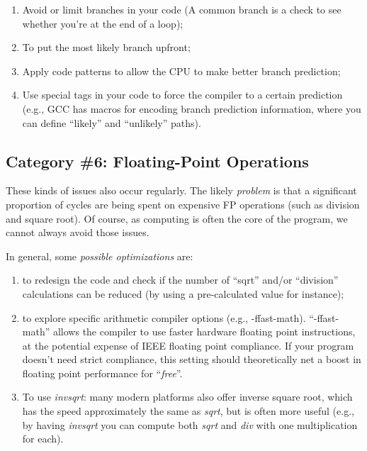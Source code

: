 \begin{enumerate}
  \item  Avoid or limit branches in your code (A common branch is a check to see whether you're at the end of a loop);
  \item  To put the most likely branch upfront;
  \item  Apply code patterns to allow the CPU to make better branch prediction;
  \item  Use special tags in your code to force the compiler to a certain prediction (e.g., GCC has macros for encoding branch prediction information, where you can define ``likely'' and ``unlikely'' paths).
\end{enumerate}

\subsection{Category \#6: Floating-Point Operations}
\label{subsec:CAT6_Optimizing_FP_Operations}

These kinds of issues also occur regularly. The likely \emph{problem} is that a significant proportion of cycles are being spent on expensive FP operations (such as division and square root). Of course, as computing is often the core of the program, we cannot always avoid those issues.



In general, some \emph{possible optimizations} are:

\begin{enumerate}
  \item  to redesign the code and check if the number of ``sqrt'' and/or ``division'' calculations can be reduced (by using a pre-calculated value for instance);
  \item  to explore specific arithmetic compiler options (e.g., -ffast-math). ``-ffast-math'' allows the compiler to use faster hardware floating point instructions, at the potential expense of IEEE floating point compliance. If your program doesn't need strict compliance, this setting should theoretically net a boost in floating point performance for ``\textit{free}''.
  \item  To use \textit{invsqrt}: many modern platforms also offer inverse square root, which has the speed approximately the same as \textit{sqrt}, but is often more useful (e.g., by having \textit{invsqrt} you can compute both \textit{sqrt} and \textit{div} with one multiplication for each).
\end{enumerate}

